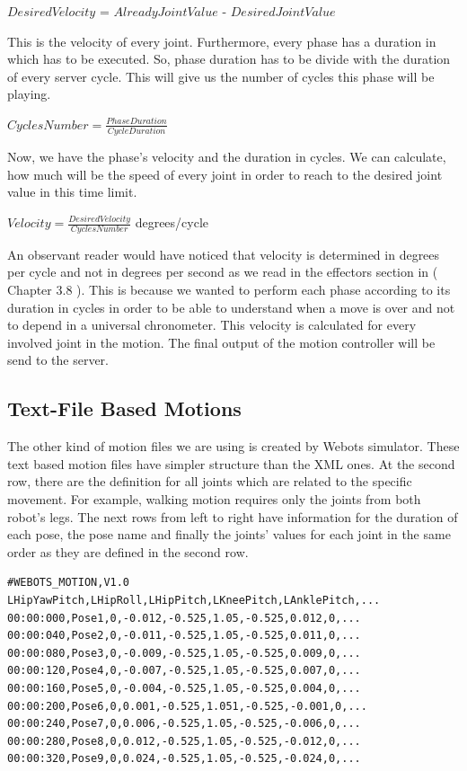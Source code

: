 \begin{center}
$Desired Velocity$ = $Already Joint Value$ - $Desired Joint Value$
\end{center}

This is the velocity of every joint. Furthermore, every phase has a duration in which has to be executed. So, phase duration has to be divide with the duration of every server cycle. This will give us the number of cycles this phase will be playing.

\begin{center}
$Cycles Number = \frac {Phase Duration} {Cycle Duration}$
\end{center}

Now, we have the phase's velocity and the duration in cycles. We can calculate, how much will be the speed of every joint in order to reach to the desired joint value in this time limit.

\begin{center}
$Velocity = \frac {Desired Velocity} {Cycles Number} $ degrees/cycle
\end{center}



An observant reader would have noticed that velocity is determined in degrees per cycle and not in degrees per second as we read in the effectors section in ( Chapter 3.8 ). This is because we wanted to perform each phase according to its duration in cycles in order to be able to understand when a move is over and not to depend in a universal chronometer.
This velocity is calculated for every involved joint in the motion. The final output of the motion controller will be send to the server.



\subsection{Text-File Based Motions}
The other kind of motion files we are using is created by Webots simulator. These text based motion files have simpler structure than the XML ones. At the second row, there are the definition for all joints which are related to the specific movement. For example, walking motion requires only the joints from both robot's legs. The next rows from left to right have information for the duration of each pose, the pose name and finally the joints' values for each joint in the same order as they are defined in the second row.
\begin{verbatim}
#WEBOTS_MOTION,V1.0
LHipYawPitch,LHipRoll,LHipPitch,LKneePitch,LAnklePitch,...
00:00:000,Pose1,0,-0.012,-0.525,1.05,-0.525,0.012,0,...
00:00:040,Pose2,0,-0.011,-0.525,1.05,-0.525,0.011,0,...
00:00:080,Pose3,0,-0.009,-0.525,1.05,-0.525,0.009,0,...
00:00:120,Pose4,0,-0.007,-0.525,1.05,-0.525,0.007,0,...
00:00:160,Pose5,0,-0.004,-0.525,1.05,-0.525,0.004,0,...
00:00:200,Pose6,0,0.001,-0.525,1.051,-0.525,-0.001,0,...
00:00:240,Pose7,0,0.006,-0.525,1.05,-0.525,-0.006,0,...
00:00:280,Pose8,0,0.012,-0.525,1.05,-0.525,-0.012,0,...
00:00:320,Pose9,0,0.024,-0.525,1.05,-0.525,-0.024,0,...
\end{verbatim}
